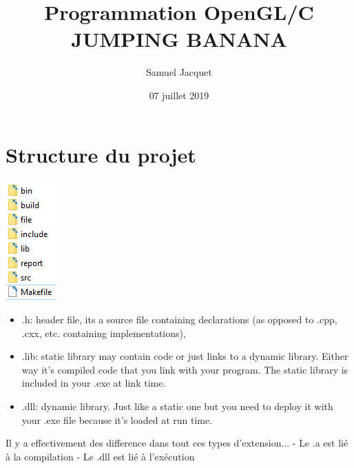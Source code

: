 \documentclass[12pt]{article}
\title{Programmation OpenGL/C\\
JUMPING BANANA}
\author{Samuel Jacquet}
\date{07 juillet 2019}
\begin{document}
\maketitle
\newpage
\tableofcontents
\newpage

\section{Structure du projet}


\begin{center}
\includegraphics[scale=1.0]{pic/struct.PNG}
\label{fig1}
\end{center}
\begin{itemize}
\item .h: header file, its a source file containing declarations (as opposed to .cpp, .cxx, etc. containing implementations), \\
\item .lib: static library may contain code or just links to a dynamic library. Either way it's compiled code that you link with your program. The static library is included in your .exe at link time. \\
\item .dll: dynamic library. Just like a static one but you need to deploy it with your .exe file because it's loaded at run time.
\end{itemize}
Il y a effectivement des difference dans tout ces types d'extension...
- Le .a est lié à la compilation
- Le .dll est lié à l'exécution
\end{document}
